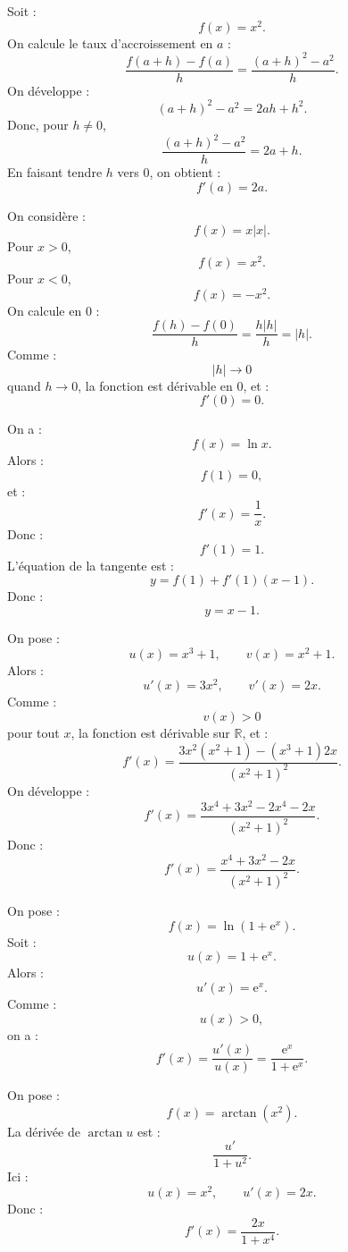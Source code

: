 \documentclass[11pt,a4paper]{article}
\newcommand{\R}{\mathbb R}
\newcommand{\e}{\mathrm e}
\begin{document}
\begin{correctionbox}[1]
Soit :
\[
f(x)=x^2.
\]
On calcule le taux d'accroissement en \(a\) :
\[
\frac{f(a+h)-f(a)}{h}
=
\frac{(a+h)^2-a^2}{h}.
\]
On développe :
\[
(a+h)^2-a^2=2ah+h^2.
\]
Donc, pour \(h\neq0\),
\[
\frac{(a+h)^2-a^2}{h}=2a+h.
\]
En faisant tendre \(h\) vers \(0\), on obtient :
\[
f'(a)=2a.
\]
\end{correctionbox}

\begin{correctionbox}[2]
On considère :
\[
f(x)=x|x|.
\]
Pour \(x>0\),
\[
f(x)=x^2.
\]
Pour \(x<0\),
\[
f(x)=-x^2.
\]
On calcule en \(0\) :
\[
\frac{f(h)-f(0)}{h}=\frac{h|h|}{h}=|h|.
\]
Comme :
\[
|h|\to0
\]
quand \(h\to0\), la fonction est dérivable en \(0\), et :
\[
f'(0)=0.
\]
\end{correctionbox}

\begin{correctionbox}[3]
On a :
\[
f(x)=\ln x.
\]
Alors :
\[
f(1)=0,
\]
et :
\[
f'(x)=\frac1x.
\]
Donc :
\[
f'(1)=1.
\]
L'équation de la tangente est :
\[
y=f(1)+f'(1)(x-1).
\]
Donc :
\[
y=x-1.
\]
\end{correctionbox}

\begin{correctionbox}[4]
On pose :
\[
u(x)=x^3+1,
\qquad
v(x)=x^2+1.
\]
Alors :
\[
u'(x)=3x^2,
\qquad
v'(x)=2x.
\]
Comme :
\[
v(x)>0
\]
pour tout \(x\), la fonction est dérivable sur \(\R\), et :
\[
f'(x)=\frac{3x^2(x^2+1)-(x^3+1)2x}{(x^2+1)^2}.
\]
On développe :
\[
f'(x)=\frac{3x^4+3x^2-2x^4-2x}{(x^2+1)^2}.
\]
Donc :
\[
f'(x)=\frac{x^4+3x^2-2x}{(x^2+1)^2}.
\]
\end{correctionbox}

\begin{correctionbox}[5]
On pose :
\[
f(x)=\ln(1+\e^x).
\]
Soit :
\[
u(x)=1+\e^x.
\]
Alors :
\[
u'(x)=\e^x.
\]
Comme :
\[
u(x)>0,
\]
on a :
\[
f'(x)=\frac{u'(x)}{u(x)}
=
\frac{\e^x}{1+\e^x}.
\]
\end{correctionbox}

\begin{correctionbox}[6]
On pose :
\[
f(x)=\arctan(x^2).
\]
La dérivée de \(\arctan u\) est :
\[
\frac{u'}{1+u^2}.
\]
Ici :
\[
u(x)=x^2,
\qquad
u'(x)=2x.
\]
Donc :
\[
f'(x)=\frac{2x}{1+x^4}.
\]
\end{correctionbox}
\end{document}
